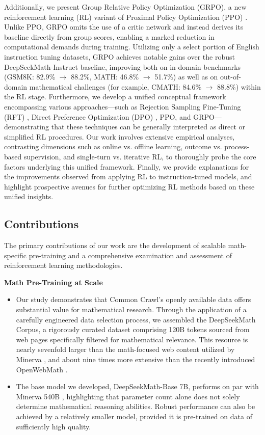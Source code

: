Additionally, we present Group Relative Policy Optimization (GRPO), a new reinforcement learning (RL) variant of Proximal Policy Optimization (PPO) \citep{schulman2017proximal}. Unlike PPO, GRPO omits the use of a critic network and instead derives its baseline directly from group scores, enabling a marked reduction in computational demands during training. Utilizing only a select portion of English instruction tuning datasets, GRPO achieves notable gains over the robust DeepSeekMath-Instruct baseline, improving both on in-domain benchmarks (GSM8K: 82.9\% $\rightarrow$ 88.2\%, MATH: 46.8\% $\rightarrow$ 51.7\%) as well as on out-of-domain mathematical challenges (for example, CMATH: 84.6\% $\rightarrow$ 88.8\%) within the RL stage. Furthermore, we develop a unified conceptual framework encompassing various approaches—such as Rejection Sampling Fine-Tuning (RFT) \citep{yuan2023scaling}, Direct Preference Optimization (DPO) \citep{dpo}, PPO, and GRPO—demonstrating that these techniques can be generally interpreted as direct or simplified RL procedures. Our work involves extensive empirical analyses, contrasting dimensions such as online vs. offline learning, outcome vs. process-based supervision, and single-turn vs. iterative RL, to thoroughly probe the core factors underlying this unified framework. Finally, we provide explanations for the improvements observed from applying RL to instruction-tuned models, and highlight prospective avenues for further optimizing RL methods based on these unified insights.

\subsection{Contributions}
The primary contributions of our work are the development of scalable math-specific pre-training and a comprehensive examination and assessment of reinforcement learning methodologies.

\textbf{Math Pre-Training at Scale}

\begin{itemize}[topsep=0pt]
    \item Our study demonstrates that Common Crawl's openly available data offers substantial value for mathematical research. Through the application of a carefully engineered data selection process, we assembled the DeepSeekMath Corpus, a rigorously curated dataset comprising 120B tokens sourced from web pages specifically filtered for mathematical relevance. This resource is nearly sevenfold larger than the math-focused web content utilized by Minerva \citep{minerva}, and about nine times more extensive than the recently introduced OpenWebMath \citep{openwebmath}.

    \item The base model we developed, DeepSeekMath-Base 7B, performs on par with Minerva 540B \citep{minerva}, highlighting that parameter count alone does not solely determine mathematical reasoning abilities. Robust performance can also be achieved by a relatively smaller model, provided it is pre-trained on data of sufficiently high quality.
\end{itemize}

